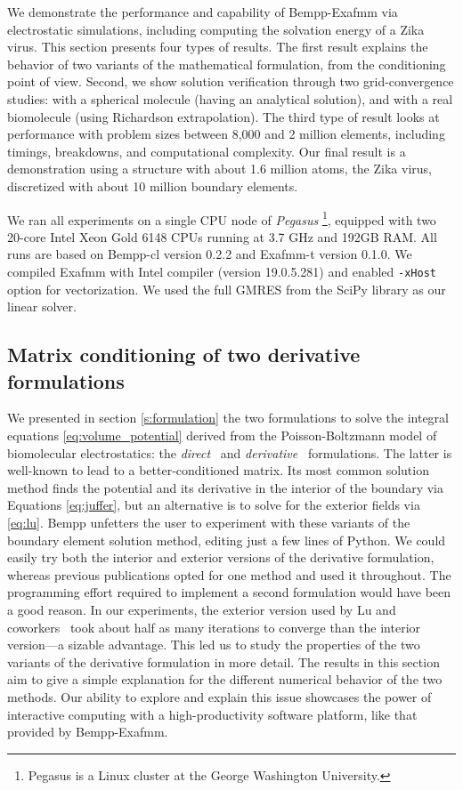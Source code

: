 We demonstrate the performance and capability of Bempp-Exafmm via electrostatic simulations, including computing the solvation energy of a Zika virus.
This section presents four types of results. 
The first result explains the behavior of two variants of the mathematical formulation, from the conditioning point of view. 
Second, we show solution verification through two grid-convergence studies: with a spherical molecule (having an analytical solution), and with a real biomolecule (using Richardson extrapolation).
The third type of result looks at performance with problem sizes between 8,000 and 2 million elements, including timings, breakdowns, and computational complexity.
Our final result is a demonstration using a structure with about 1.6 million atoms, the Zika virus, discretized with about 10 million boundary elements.

We ran all experiments on a single CPU node of \textit{Pegasus} \footnote{Pegasus is a Linux cluster at the George Washington University.}, equipped with two 20-core Intel Xeon Gold 6148 CPUs running at 3.7 GHz and 192GB RAM.
All runs are based on Bempp-cl version 0.2.2 and Exafmm-t version 0.1.0.
We compiled Exafmm with Intel compiler (version 19.0.5.281) and enabled \texttt{-xHost} option for vectorization.
We used the full GMRES from the SciPy library as our linear solver.

\subsection{Matrix conditioning of two derivative formulations} \label{result_conditioning}

We presented in section \ref{s:formulation} the two formulations to solve the integral equations  \eqref{eq:volume_potential} derived from the Poisson-Boltzmann model of biomolecular electrostatics: 
the \emph{direct}~\cite{YoonLenhoff1990}  and \emph{derivative}~\cite{JufferETal1991} formulations.
The latter is well-known to lead to a better-conditioned matrix.
Its most common solution method finds the potential and its derivative in the interior of the boundary via Equations \eqref{eq:juffer}, but an alternative is to solve for the exterior fields via \eqref{eq:lu}.
Bempp unfetters the user to experiment with these variants of the boundary element solution method, editing just a few lines of Python.
We could easily try both the interior and exterior versions of the derivative formulation, whereas previous publications opted for one method and used it throughout.
The programming effort required to implement a second formulation would have been a good reason.
In our experiments, the exterior version used by Lu and coworkers~\cite{LuETal2006,LuETal2009,ZhangETal2019} took about half as many iterations to converge than the interior version---a sizable advantage.
This led us to study the properties of the two variants of the derivative formulation in more detail.
The results in this section aim to give a simple explanation for the different numerical behavior of the two methods.
Our ability to explore and explain this issue showcases the power of interactive computing with a high-productivity software platform, like that provided by Bempp-Exafmm.

